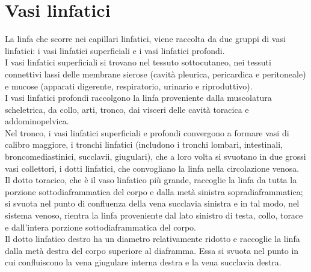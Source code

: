 \section{Vasi linfatici}
La linfa che scorre nei capillari linfatici, viene raccolta da due gruppi di vasi linfatici: i vasi linfatici 
superficiali e i vasi linfatici profondi.\\ 
I vasi linfatici superficiali si trovano nel tessuto sottocutaneo, nei tessuti connettivi lassi delle membrane sierose 
(cavità pleurica, pericardica e peritoneale) e mucose (apparati digerente, respiratorio, urinario e riproduttivo).\\ 
I vasi linfatici profondi raccolgono la linfa proveniente dalla muscolatura scheletrica, da collo, arti, tronco, 
dai visceri delle cavità toracica e addominopelvica\cite{BOOK1}.\\
Nel tronco, i vasi linfatici superficiali e profondi convergono a formare vasi di calibro maggiore, 
i tronchi linfatici (includono i tronchi lombari, intestinali, broncomediastinici, succlavii, giugulari), 
che a loro volta si svuotano in due grossi vasi collettori, i dotti linfatici, che convogliano la linfa 
nella circolazione venosa.\\  
Il dotto toracico, che è il vaso linfatico più grande, raccoglie la linfa da tutta la porzione sottodiaframmatica 
del corpo e dalla metà sinistra sopradiaframmatica; si svuota nel punto di confluenza della vena succlavia sinistra e 
in tal modo, nel sistema venoso, rientra la linfa proveniente dal lato sinistro di testa, collo, torace e 
dall’intera porzione sottodiaframmatica del corpo.\\ 
Il dotto linfatico destro ha un diametro relativamente ridotto e raccoglie la linfa dalla metà destra 
del corpo superiore al diaframma. Essa si svuota nel punto in cui confluiscono la vena giugulare interna destra e la 
vena succlavia destra\cite{BOOK1}.\\
 

